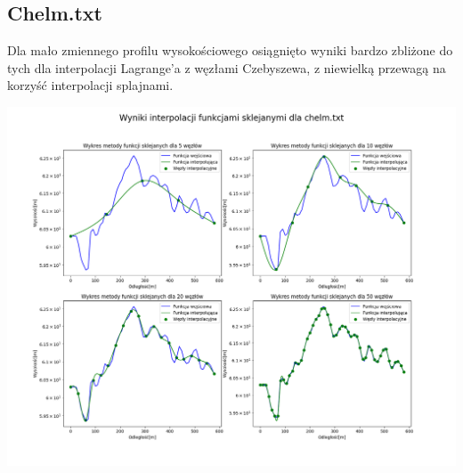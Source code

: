 \documentclass[a4paper,12pt]{article}
\begin{document}
	\subsection{Chelm.txt}
	Dla mało zmiennego profilu wysokościowego osiągnięto wyniki bardzo zbliżone do tych dla interpolacji Lagrange'a z węzłami Czebyszewa, z niewielką przewagą na korzyść interpolacji splajnami. 
	\begin{center}
        \includegraphics[scale=0.4]{../charts/cubic_spline_chelm.png}
    \end{center}
    
    \newpage
\end{document}
